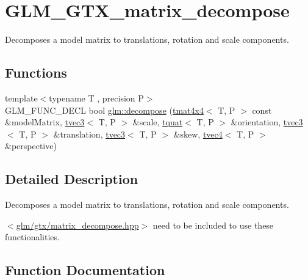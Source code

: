 \hypertarget{group__gtx__matrix__decompose}{}\section{G\+L\+M\+\_\+\+G\+T\+X\+\_\+matrix\+\_\+decompose}
\label{group__gtx__matrix__decompose}


Decomposes a model matrix to translations, rotation and scale components.  


\subsection*{Functions}
\begin{DoxyCompactItemize}
\item 
{\footnotesize template$<$typename T , precision P$>$ }\\G\+L\+M\+\_\+\+F\+U\+N\+C\+\_\+\+D\+E\+CL bool \hyperlink{group__gtx__matrix__decompose_ga0f1245817507156b337798a253577c8b}{glm\+::decompose} (\hyperlink{structglm_1_1tmat4x4}{tmat4x4}$<$ T, P $>$ const \&model\+Matrix, \hyperlink{structglm_1_1tvec3}{tvec3}$<$ T, P $>$ \&scale, \hyperlink{structglm_1_1tquat}{tquat}$<$ T, P $>$ \&orientation, \hyperlink{structglm_1_1tvec3}{tvec3}$<$ T, P $>$ \&translation, \hyperlink{structglm_1_1tvec3}{tvec3}$<$ T, P $>$ \&skew, \hyperlink{structglm_1_1tvec4}{tvec4}$<$ T, P $>$ \&perspective)
\end{DoxyCompactItemize}


\subsection{Detailed Description}
Decomposes a model matrix to translations, rotation and scale components. 

$<$\hyperlink{matrix__decompose_8hpp}{glm/gtx/matrix\+\_\+decompose.\+hpp}$>$ need to be included to use these functionalities. 

\subsection{Function Documentation}
\mbox{\label{group__gtx__matrix__decompose_ga0f1245817507156b337798a253577c8b}} 
